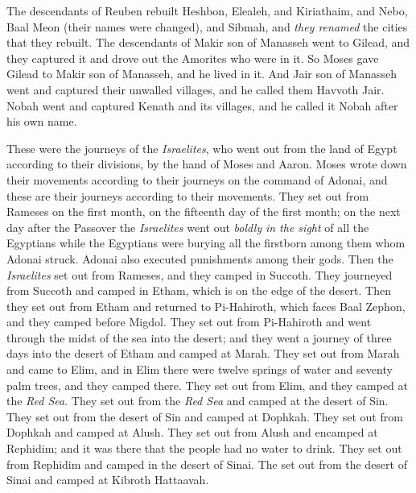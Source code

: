\begin{biblechapter}
\verse The descendants of Reuben rebuilt Heshbon, Elealeh, and Kiriathaim,
\verse and Nebo, Baal Meon (their names were changed), and Sibmah, and \textit{they renamed} the cities that they rebuilt.
\verse The descendants of Makir son of Manasseh went to Gilead, and they captured it and drove out the Amorites who were in it.
\verse So Moses gave Gilead to Makir son of Manasseh, and he lived in it.
\verse And Jair son of Manasseh went and captured their unwalled villages, and he called them Havvoth Jair.
\verse Nobah went and captured Kenath and its villages, and he called it Nobah after his own name.
\end{biblechapter}

\begin{biblechapter} %
 These were the journeys of the \textit{Israelites}, who went out from the land of Egypt according to their divisions, by the hand of Moses and Aaron.
\verse Moses wrote down their movements according to their journeys on the command of Adonai, and these are their journeys according to their movements.
\verse They set out from Rameses on the first month, on the fifteenth day of the first month; on the next day after the Passover the \textit{Israelites} went out \textit{boldly} \textit{in the sight} of all the Egyptians
\verse while the Egyptians were burying all the firstborn among them whom Adonai struck. Adonai also executed punishments among their gods.
\verse Then the \textit{Israelites} set out from Rameses, and they camped in Succoth.
\verse They journeyed from Succoth and camped in Etham, which is on the edge of the desert.
\verse Then they set out from Etham and returned to Pi-Hahiroth, which faces Baal Zephon, and they camped before Migdol.
\verse They set out from Pi-Hahiroth and went through the midst of the sea into the desert; and they went a journey of three days into the desert of Etham and camped at Marah.
\verse They set out from Marah and came to Elim, and in Elim there were twelve springs of water and seventy palm trees, and they camped there.
\verse They set out from Elim, and they camped at the \textit{Red Sea}.
\verse They set out from the \textit{Red Sea} and camped at the desert of Sin.
\verse They set out from the desert of Sin and camped at Dophkah.
\verse They set out from Dophkah and camped at Alush.
\verse They set out from Alush and encamped at Rephidim; and it was there that the people had no water to drink.
\verse They set out from Rephidim and camped in the desert of Sinai.
\verse The set out from the desert of Sinai and camped at Kibroth Hattaavah.

\end{biblechapter}
